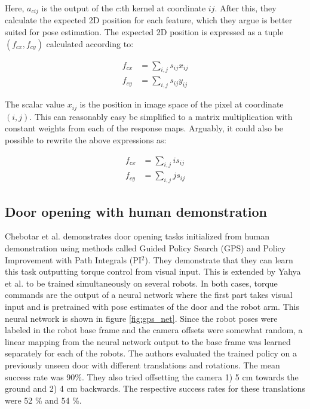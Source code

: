 Here, $a_{cij}$ is the output of the $c$:th kernel at coordinate $ij$. After
this, they calculate the expected 2D position for each feature, which they
argue is better suited for pose estimation. The expected 2D position is
expressed as a tuple $(f_{cx}, f_{cy})$ calculated according to:

\begin{align}
    f_{cx} &= \sum_{i,j} s_{ij} x_{ij} \\
    f_{cy} &= \sum_{i,j} s_{ij} y_{ij}
\end{align}

The scalar value $x_{ij}$ is the position in image space of the pixel at coordinate
$(i, j)$. This can reasonably easy be simplified to a matrix multiplication with constant
weights from each of the response maps. Arguably, it could also be possible to rewrite the
above expressions as:

\begin{align}
    f_{cx} &= \sum_{i,j} i s_{ij} \\
    f_{cy} &= \sum_{i,j} j s_{ij}
\end{align}

\subsection{Door opening with human demonstration}

Chebotar et al. \cite{chebotar2016path} demonstrates door opening tasks
initialized from human demonstration using methods called Guided Policy Search
(GPS) and Policy Improvement with Path Integrals (PI$^2$). They demonstrate
that they can learn this task outputting torque control from visual input. This is
extended by Yahya et al. \cite{yahya2016collective} to be trained
simultaneously on several robots. In both cases, torque commands are the output
of a neural network where the first part takes visual input and is pretrained
with pose estimates of the door and the robot arm. This neural network is shown
in figure \ref{fig:gps_net}. Since the robot poses were labeled in the robot
base frame and the camera offsets were somewhat random, a linear mapping from
the neural network output to the base frame was learned separately for each of
the robots. The authors evaluated the trained policy on a previously unseen
door with different translations and rotations. The mean success rate was
90\%. They also tried offsetting the camera 1) 5 cm towards the ground and 2) 4
cm backwards. The respective success rates for these translations were 52 \%
and 54 \%.


